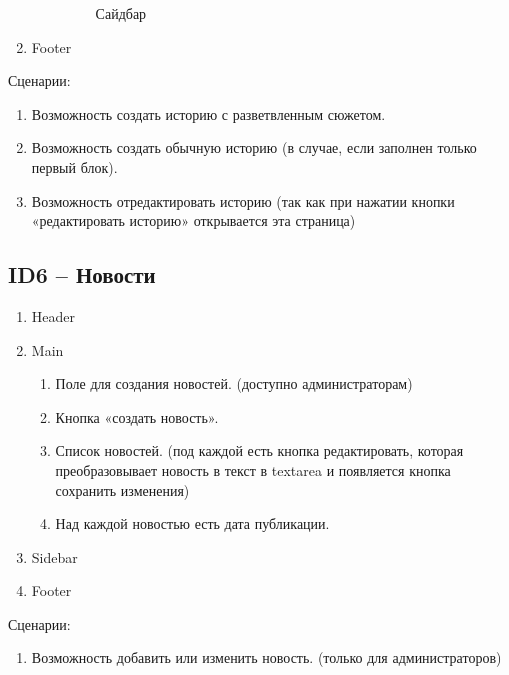 \documentclass[a4paper]{article}
\begin{document}
\begin{enumerate}
\begin{enumerate}
\begin{figure}[h]
						\caption{Сайдбар}
					\end{figure}
				\end{enumerate}
				\item Footer
			\end{enumerate}
			\large{Сценарии:}
				\begin{enumerate}
					\item Возможность создать историю с разветвленным сюжетом.
					\item Возможность создать обычную историю (в случае, если заполнен только первый блок).
					\item Возможность отредактировать историю (так как при нажатии кнопки «редактировать историю» открывается эта страница)
				\end{enumerate}
		\newpage
		\subsection{ID6 – Новости}
			\begin{enumerate}
				\item Header
				\item Main
				\begin{enumerate}
					\item Поле для создания новостей. (доступно администраторам)
					\item Кнопка «создать новость».
					\item Список новостей. (под каждой есть кнопка редактировать, которая преобразовывает новость в текст в textarea и появляется кнопка сохранить изменения)
					\item Над каждой новостью есть дата публикации.
				\end{enumerate}
				\item Sidebar
				\item Footer
			\end{enumerate}
			\large{Сценарии:}
				\begin{enumerate}
					\item Возможность добавить или изменить новость. (только для администраторов)
				\end{enumerate}
		\newpage
\end{document}
